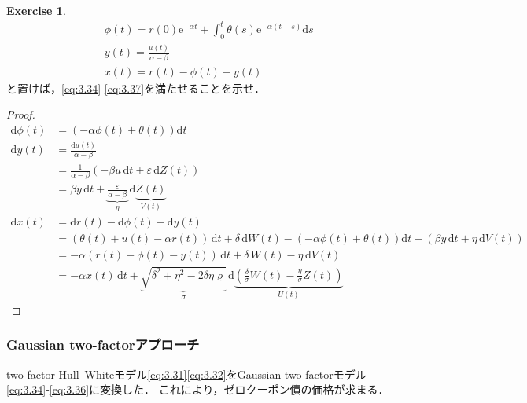 \documentclass[a4paper, lualatex, ja=standard]{bxjsarticle}
\theoremstyle{theorem}
\theoremstyle{definition}
\newtheorem{exer}[thm]{Exercise}
\theoremstyle{definition}
\newcommand{\diff}{\mathrm{d}}
\begin{document}
\begin{exer}
  \begin{align*}
    & \phi(t)=r(0) \mathrm{e}^{-\alpha t}+\int_0^t \theta(s) \mathrm{e}^{-\alpha(t-s)} \diff s \\ 
    & y(t)=\frac{u(t)}{\alpha-\beta} \\ 
    & x(t)=r(t)-\phi(t)-y(t)
  \end{align*}
  と置けば，\eqref{eq:3.34}-\eqref{eq:3.37}を満たせることを示せ．
\end{exer}
\begin{proof}
  \begin{align*}
    \diff \phi(t) &= (-\alpha \phi(t) + \theta(t) )\diff t \\
    \diff y(t) &= \frac{\diff u(t)}{\alpha-\beta} \\
    &= \frac{1}{\alpha-\beta}(-\beta u\,\diff t+\varepsilon\,\diff Z(t)) \\
    &= \beta y\,\diff t + \underbrace{\frac{\varepsilon}{\alpha-\beta}}_{\eta}\,\diff \underbrace{Z(t)}_{V(t)}\\
    \diff x(t) &= \diff r(t) - \diff \phi(t) - \diff y(t) \\
    &= (\theta(t)+u(t)-\alpha r(t))\,\diff t + \delta\,\diff W(t) - (-\alpha \phi(t) + \theta(t) )\diff t - (\beta y\,\diff t + \eta\,\diff V(t)) \\
    &= -\alpha(r(t)-\phi(t)-y(t))\,\diff t + \delta\,W(t) - \eta\,\diff V(t) \\
    &= -\alpha x(t)\,\diff t + \underbrace{\sqrt{\delta^2+\eta^2-2\delta\eta\varrho}}_{\sigma}\,\diff \underbrace{\left(\frac{\delta}{\sigma}W(t)-\frac{\eta}{\sigma}Z(t)\right)}_{U(t)}
  \end{align*}
\end{proof}

\subsubsection*{Gaussian two-factorアプローチ}
two-factor Hull--Whiteモデル\eqref{eq:3.31}\eqref{eq:3.32}をGaussian two-factorモデル\eqref{eq:3.34}-\eqref{eq:3.36}に変換した．
これにより，ゼロクーポン債の価格が求まる．
\end{document}
